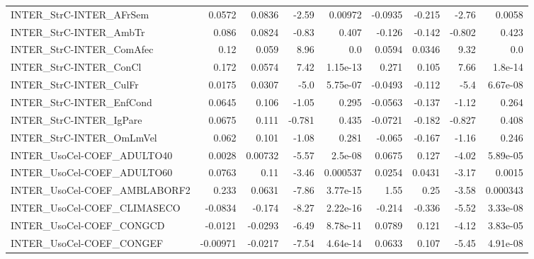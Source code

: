 \begin{tabular}{lrrrrrrrr}
INTER\_StrC-INTER\_AFrSem                &      0.0572 &       0.0836 &   -2.59 &  0.00972 &    -0.0935 &      -0.215 &        -2.76 &        0.0058 \\
INTER\_StrC-INTER\_AmbTr                 &       0.086 &       0.0824 &   -0.83 &    0.407 &     -0.126 &      -0.142 &       -0.802 &         0.423 \\
INTER\_StrC-INTER\_ComAfec               &        0.12 &        0.059 &    8.96 &      0.0 &     0.0594 &      0.0346 &         9.32 &           0.0 \\
INTER\_StrC-INTER\_ConCl                 &       0.172 &       0.0574 &    7.42 & 1.15e-13 &      0.271 &       0.105 &         7.66 &       1.8e-14 \\
INTER\_StrC-INTER\_CulFr                 &      0.0175 &       0.0307 &    -5.0 & 5.75e-07 &    -0.0493 &      -0.112 &         -5.4 &      6.67e-08 \\
INTER\_StrC-INTER\_EnfCond               &      0.0645 &        0.106 &   -1.05 &    0.295 &    -0.0563 &      -0.137 &        -1.12 &         0.264 \\
INTER\_StrC-INTER\_IgPare                &      0.0675 &        0.111 &  -0.781 &    0.435 &    -0.0721 &      -0.182 &       -0.827 &         0.408 \\
INTER\_StrC-INTER\_OmLmVel               &       0.062 &        0.101 &   -1.08 &    0.281 &     -0.065 &      -0.167 &        -1.16 &         0.246 \\
INTER\_UsoCel-COEF\_ADULTO40             &      0.0028 &      0.00732 &   -5.57 &  2.5e-08 &     0.0675 &       0.127 &        -4.02 &      5.89e-05 \\
INTER\_UsoCel-COEF\_ADULTO60             &      0.0763 &         0.11 &   -3.46 & 0.000537 &     0.0254 &      0.0431 &        -3.17 &        0.0015 \\
INTER\_UsoCel-COEF\_AMBLABORF2           &       0.233 &       0.0631 &   -7.86 & 3.77e-15 &       1.55 &        0.25 &        -3.58 &      0.000343 \\
INTER\_UsoCel-COEF\_CLIMASECO            &     -0.0834 &       -0.174 &   -8.27 & 2.22e-16 &     -0.214 &      -0.336 &        -5.52 &      3.33e-08 \\
INTER\_UsoCel-COEF\_CONGCD               &     -0.0121 &      -0.0293 &   -6.49 & 8.78e-11 &     0.0789 &       0.121 &        -4.12 &      3.83e-05 \\
INTER\_UsoCel-COEF\_CONGEF               &    -0.00971 &      -0.0217 &   -7.54 & 4.64e-14 &     0.0633 &       0.107 &        -5.45 &      4.91e-08 \\

\end{tabular}
